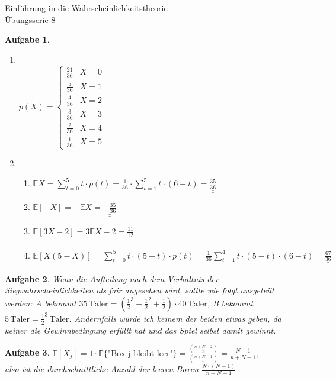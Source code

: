\documentclass[11pt]{article}
\theoremstyle{break}
\newtheorem{task}{Aufgabe}
\newcommand{\set}[1]{\ensuremath{\{#1\}}}
\begin{document}
\begin{center}
\Large{Einführung in die Wahrscheinlichkeitstheorie}\\
\large{Übungsserie 8}
\end{center}
\begin{task}
    \hfill\vspace{5mm}
    \begin{enumerate}[label={(\alph*)}]
        \item \hfill\vspace{-4mm}\\$p(X) = \begin{cases}
            \frac{21}{36}& X=0\\
            \frac{5}{36}& X=1\\
            \frac{4}{36}& X=2\\
            \frac{3}{36}& X=3\\
            \frac{2}{36}& X=4\\
            \frac{1}{36}& X=5
        \end{cases}$
        \item \hfill\vspace{-5mm}\begin{enumerate}[label={\Roman*.}]
            \item $\mathbb{E}X = \sum\limits_{t=0}^{5} t\cdot p(t) = \frac{1}{36}\cdot\sum\limits_{t=1}^{5}t\cdot(6-t) = \underline{\underline{\frac{35}{36}}}$
            \item $\mathbb{E}[-X] = -\mathbb{E}X = \underline{\underline{-\frac{35}{36}}}$
            \item $\mathbb{E}[3X-2] = 3\mathbb{E}X-2 = \underline{\underline{\frac{11}{12}}}$
            \item $\mathbb{E}[X(5-X)] = \sum\limits_{t=0}^{5} t\cdot(5-t)\cdot p(t) = \frac{1}{36}\sum\limits_{t=1}^{4} t\cdot(5-t)\cdot (6-t) = \underline{\underline{\frac{67}{36}}}$
        \end{enumerate}
    \end{enumerate}
\end{task}
\begin{task}
    Wenn die Aufteilung nach dem Verhältnis der Siegwahrscheinlichkeiten als fair angesehen wird, sollte wie folgt ausgeteilt werden:
    $A$ bekommt $35\,\text{Taler} = (\frac{1}{2}^3 + \frac{1}{2}^2 + \frac{1}{2})\cdot 40\,\text{Taler}$, B bekommt $5\,\text{Taler} = \frac{1}{2}^3 \,\text{Taler}$.
    Andernfalls würde ich keinem der beiden etwas geben, da keiner die Gewinnbedingung erfüllt hat und das Spiel selbst damit gewinnt.
\end{task}
\setcounter{task}{4}
\begin{task}
    $\mathbb{E}[X_j] = 1\cdot \mathbb{P}\set{\text{"Box j bleibt leer"}} = \frac{\binom{n + N - 2}{n}}{\binom{n + N - 1}{n}} = \frac{N-1}{n + N - 1}$,\\
    also ist die durchschnittliche Anzahl der leeren Boxen $\frac{N\cdot(N-1)}{n + N - 1}$
\end{task}
\end{document}
